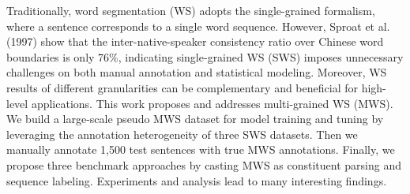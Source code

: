 Traditionally, word segmentation (WS) adopts the single-grained formalism, where a sentence corresponds to a single word sequence. However, Sproat et al. (1997) show that the inter-native-speaker consistency ratio over Chinese word boundaries is only 76\%, indicating single-grained WS (SWS) imposes unnecessary challenges on both manual annotation and statistical modeling. Moreover, WS results of different granularities can be complementary and beneficial for high-level applications. This work proposes and addresses multi-grained WS (MWS). We build a large-scale pseudo MWS dataset for model training and tuning by leveraging the annotation heterogeneity of three SWS datasets. Then we manually annotate 1,500 test sentences with true MWS annotations. Finally, we propose three benchmark approaches by casting MWS as constituent parsing and sequence labeling. Experiments and analysis lead to many interesting findings.
